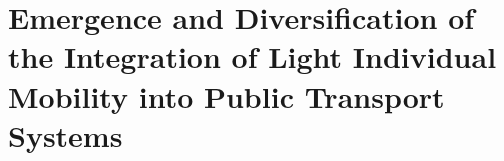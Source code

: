 
\chapter
{Emergence and Diversification of the Integration of Light Individual Mobility into Public Transport Systems
    \label{chap4:titre}
    }
    \begin{refsegment}



\end{refsegment}

